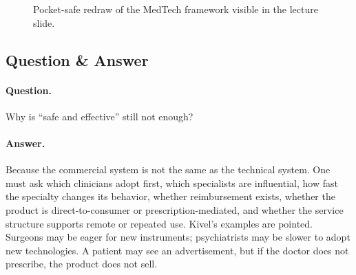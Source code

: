 \begin{figure}[htbp]
\centering
{}
\caption{Pocket-safe redraw of the MedTech framework visible in the lecture slide.}
\end{figure}

\subsection{Question \& Answer}

\paragraph{Question.} Why is ``safe and effective'' still not enough?

\paragraph{Answer.} Because the commercial system is not the same as the technical system. One must ask which clinicians adopt first, which specialists are influential, how fast the specialty changes its behavior, whether reimbursement exists, whether the product is direct-to-consumer or prescription-mediated, and whether the service structure supports remote or repeated use. Kivel's examples are pointed. Surgeons may be eager for new instruments; psychiatrists may be slower to adopt new technologies. A patient may see an advertisement, but if the doctor does not prescribe, the product does not sell.

